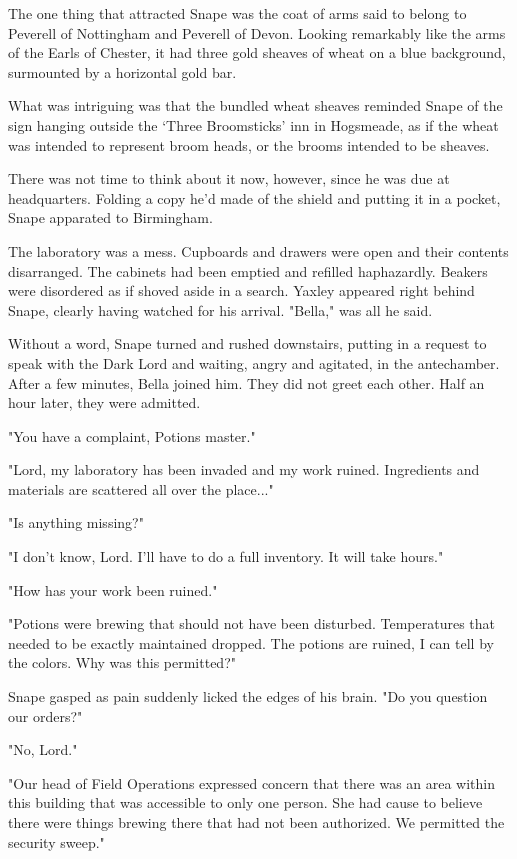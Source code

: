 \documentclass[a4paper,11pt]{article}
\begin{document}
The one thing that attracted Snape was the coat of arms said to belong to Peverell of Nottingham and Peverell of Devon. Looking remarkably like the arms of the Earls of Chester, it had three gold sheaves of wheat on a blue background, surmounted by a horizontal gold bar.

What was intriguing was that the bundled wheat sheaves reminded Snape of the sign hanging outside the `Three Broomsticks' inn in Hogsmeade, as if the wheat was intended to represent broom heads, or the brooms intended to be sheaves.

There was not time to think about it now, however, since he was due at headquarters. Folding a copy he'd made of the shield and putting it in a pocket, Snape apparated to Birmingham.

The laboratory was a mess. Cupboards and drawers were open and their contents disarranged. The cabinets had been emptied and refilled haphazardly. Beakers were disordered as if shoved aside in a search. Yaxley appeared right behind Snape, clearly having watched for his arrival. "Bella," was all he said.

Without a word, Snape turned and rushed downstairs, putting in a request to speak with the Dark Lord and waiting, angry and agitated, in the antechamber. After a few minutes, Bella joined him. They did not greet each other. Half an hour later, they were admitted.

"You have a complaint, Potions master."

"Lord, my laboratory has been invaded and my work ruined. Ingredients and materials are scattered all over the place..."

"Is anything missing?"

"I don't know, Lord. I'll have to do a full inventory. It will take hours."

"How has your work been ruined."

"Potions were brewing that should not have been disturbed. Temperatures that needed to be exactly maintained dropped. The potions are ruined, I can tell by the colors. Why was this permitted?"

Snape gasped as pain suddenly licked the edges of his brain. "Do you question our orders?"

"No, Lord."

"Our head of Field Operations expressed concern that there was an area within this building that was accessible to only one person. She had cause to believe there were things brewing there that had not been authorized. We permitted the security sweep."
\end{document}

